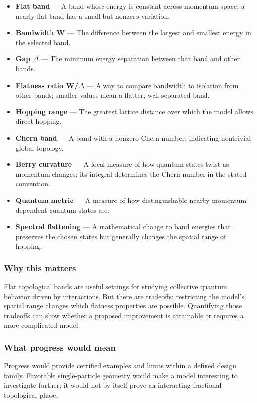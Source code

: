 \documentclass[
  11pt,
]{article}
\begin{document}
\begin{itemize}
\item
  \textbf{Flat band} --- A band whose energy is constant across momentum
  space; a nearly flat band has a small but nonzero variation.
\item
  \textbf{Bandwidth W} --- The difference between the largest and
  smallest energy in the selected band.
\item
  \textbf{Gap \ensuremath{\Delta}} --- The minimum energy separation
  between that band and other bands.
\item
  \textbf{Flatness ratio W/\ensuremath{\Delta}} --- A way to compare
  bandwidth to isolation from other bands; smaller values mean a
  flatter, well-separated band.
\item
  \textbf{Hopping range} --- The greatest lattice distance over which
  the model allows direct hopping.
\item
  \textbf{Chern band} --- A band with a nonzero Chern number, indicating
  nontrivial global topology.
\item
  \textbf{Berry curvature} --- A local measure of how quantum states
  twist as momentum changes; its integral determines the Chern number in
  the stated convention.
\item
  \textbf{Quantum metric} --- A measure of how distinguishable nearby
  momentum-dependent quantum states are.
\item
  \textbf{Spectral flattening} --- A mathematical change to band
  energies that preserves the chosen states but generally changes the
  spatial range of hopping.
\end{itemize}

\subsubsection{Why this matters}

Flat topological bands are useful settings for studying collective
quantum behavior driven by interactions. But there are tradeoffs:
restricting the model's spatial range changes which flatness properties
are possible. Quantifying those tradeoffs can show whether a proposed
improvement is attainable or requires a more complicated model.

\subsubsection{What progress would mean}

Progress would provide certified examples and limits within a defined
design family. Favorable single-particle geometry would make a model
interesting to investigate further; it would not by itself prove an
interacting fractional topological phase.
\end{document}
